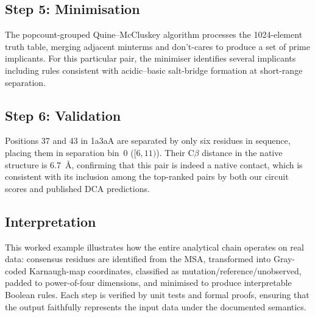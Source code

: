 \subsection{Step 5: Minimisation}
The popcount-grouped Quine--McCluskey algorithm processes the 1024-element
truth table, merging adjacent minterms and don't-cares to produce a set of
prime implicants.  For this particular pair, the minimiser identifies several
implicants including rules consistent with acidic--basic salt-bridge formation
at short-range separation.

\subsection{Step 6: Validation}
Positions 37 and 43 in 1a3aA are separated by only six residues in sequence,
placing them in separation bin~0 ($[6, 11)$).  Their C$\beta$ distance in the
native structure is 6.7~\AA, confirming that this pair is indeed a native
contact, which is consistent with its inclusion among the top-ranked pairs by
both our circuit scores and published DCA predictions.

\subsection{Interpretation}
This worked example illustrates how the entire analytical chain operates on
real data: consensus residues are identified from the MSA, transformed into
Gray-coded Karnaugh-map coordinates, classified as mutation/reference/unobserved,
padded to power-of-four dimensions, and minimised to produce interpretable
Boolean rules.  Each step is verified by unit tests and formal proofs,
ensuring that the output faithfully represents the input data under the
documented semantics.
